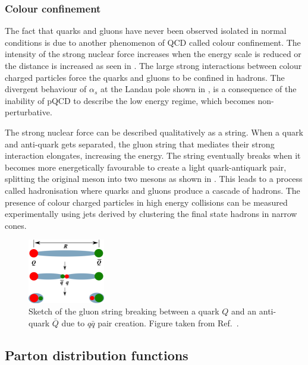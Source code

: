 \subsubsection{Colour confinement}

The fact that quarks and gluons have never been observed isolated in normal conditions is due to another phenomenon of QCD called colour confinement. The intensity of the strong nuclear force increases when the energy scale is reduced or the distance is increased as seen in . The large strong interactions between colour charged particles force the quarks and gluons to be confined in hadrons. The divergent behaviour of $\alpha_{s}$ at the Landau pole shown in , is a consequence of the inability of pQCD to describe the low energy regime, which becomes non-perturbative.%

The strong nuclear force can be described qualitatively as a string. When a quark and anti-quark gets separated, the gluon string that mediates their strong interaction elongates, increasing the energy. The string eventually breaks when it becomes more energetically favourable to create a light quark-antiquark pair, splitting the original meson into two mesons as shown in . This leads to a process called hadronisation where quarks and gluons produce a cascade of hadrons. The presence of colour charged particles in high energy collisions can be measured experimentally using jets derived by clustering the final state hadrons in narrow cones.

\begin{figure}[!htb]
 \centering
 \includegraphics[width=0.3\textwidth]{Figures/Introduction/StandardModel/QCDConfinement.png}
 \caption{Sketch of the gluon string breaking between a quark $Q$ and an anti-quark $\bar{Q}$ due to $q\bar{q}$ pair creation. Figure taken from Ref.~\cite{QCDConfinement_Figure}.}
 \label{fig:QCDConfinement}
\end{figure}

\subsection{Parton distribution functions}\label{sec:Physics_SI_PDF}

